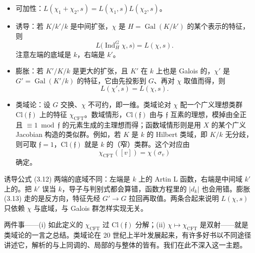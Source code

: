 \begin{itemize}[leftmargin=2.2em,itemsep=0.3em]
\item 可加性：$L(\chi_1+\chi_2,s)=L(\chi_1,s)L(\chi_2,s)$。
\item 诱导：若 $K/k'/k$ 是中间扩张，$\chi$ 是 $H=\operatorname{Gal}(K/k')$ 的某个表示的特征，则
\begin{equation}\tag{3.12}\label{c4:eq:3.12}
L\bigl(\operatorname{Ind}^{G}_{H}\chi,s\bigr)=L(\chi,s).
\end{equation}
注意左端的底域是 $k$，右端是 $k'$。
\item 膨胀：若 $K'/K/k$ 是更大的扩张，且 $K'$ 在 $k$ 上也是 Galois 的，$\chi'$ 是 $G'=\operatorname{Gal}(K'/k)$ 的特征，它由先投影到 $G$、再对 $\chi$ 取值而得，则
\begin{equation}\tag{3.13}\label{c4:eq:3.13}
L(\chi',s)=L(\chi,s).
\end{equation}
\item 类域论：设 $G$ 交换、$\chi$ 不可约，即一维。类域论对 $\chi$ 配一个广义理想类群 $\mathrm{Cl}(\mathfrak{f})$ 上的特征 $\chi_{\mathrm{CFT}}$。数域情形，$\mathrm{Cl}(\mathfrak{f})$ 由与 $\mathfrak{f}$ 互素的理想，模掉由全正且 $\equiv1\bmod\mathfrak{f}$ 的元素生成的主理想而得；函数域情形则是用 $X$ 的某个广义 Jacobian 构造的类似群。例如，若 $K$ 是 $k$ 的 Hilbert 类域，即 $K/k$ 无分歧，则可取 $\mathfrak{f}=1$，$\mathrm{Cl}(\mathfrak{f})$ 就是 $k$ 的（窄）类群。这个对应由
\begin{equation}\tag{3.14}\label{c4:eq:3.14}
\chi_{\mathrm{CFT}}([v])=\chi(\sigma_v)
\end{equation}
确定。
\end{itemize}

\begin{annote}
诱导公式 (3.12) 两端的底域不同：左端是 $k$ 上的 Artin L 函数，右端是中间域 $k'$ 上的。把 $k'$ 误当 $k$，导子与判别式都会算错，函数方程里的 $|d_k|$ 也会用错。膨胀 (3.13) 走的是反方向，特征先经 $G'\to G$ 拉回再取值。两条合起来说明 $L(\chi,s)$ 只依赖 $\chi$ 与底域，与 Galois 群怎样实现无关。
\par\vspace{0.15em}{\raggedleft 【来源：Martinet《Character theory and Artin L-functions》，Durham 会议录（A）；Serre《Zeta and L functions》（A）】\par}
\end{annote}

两件事——(i) 如此定义的 $\chi_{\mathrm{CFT}}$ 过 $\mathrm{Cl}(\mathfrak{f})$ 分解；(ii) $\chi\mapsto\chi_{\mathrm{CFT}}$ 是双射——就是类域论的一言之总结。类域论在 20 世纪上半叶发展起来，有许多好书以不同途径讲述它，解析的与上同调的、局部的与整体的皆有。我们在此不深入这一主题。

